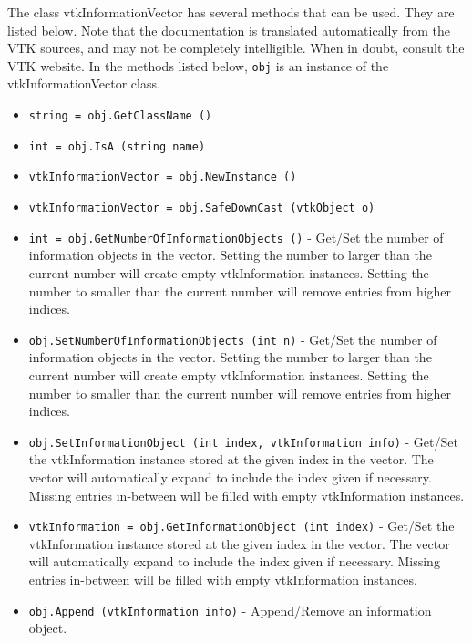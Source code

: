 The class vtkInformationVector has several methods that can be used.
  They are listed below.
Note that the documentation is translated automatically from the VTK sources,
and may not be completely intelligible.  When in doubt, consult the VTK website.
In the methods listed below, \verb|obj| is an instance of the vtkInformationVector class.
\begin{itemize}
\item  \verb|string = obj.GetClassName ()|

\item  \verb|int = obj.IsA (string name)|

\item  \verb|vtkInformationVector = obj.NewInstance ()|

\item  \verb|vtkInformationVector = obj.SafeDownCast (vtkObject o)|

\item  \verb|int = obj.GetNumberOfInformationObjects ()| -  Get/Set the number of information objects in the vector.  Setting
 the number to larger than the current number will create empty
 vtkInformation instances.  Setting the number to smaller than the
 current number will remove entries from higher indices.

\item  \verb|obj.SetNumberOfInformationObjects (int n)| -  Get/Set the number of information objects in the vector.  Setting
 the number to larger than the current number will create empty
 vtkInformation instances.  Setting the number to smaller than the
 current number will remove entries from higher indices.

\item  \verb|obj.SetInformationObject (int index, vtkInformation info)| -  Get/Set the vtkInformation instance stored at the given index in
 the vector.  The vector will automatically expand to include the
 index given if necessary.  Missing entries in-between will be
 filled with empty vtkInformation instances.

\item  \verb|vtkInformation = obj.GetInformationObject (int index)| -  Get/Set the vtkInformation instance stored at the given index in
 the vector.  The vector will automatically expand to include the
 index given if necessary.  Missing entries in-between will be
 filled with empty vtkInformation instances.

\item  \verb|obj.Append (vtkInformation info)| -  Append/Remove an information object.


\end{itemize}

